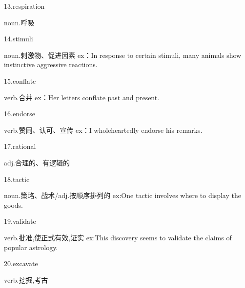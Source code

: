 \documentclass[a4paper, 10pt]{article}
\begin{document}
13.respiration 

noun.呼吸

14.stimuli 

noun.刺激物、促进因素 ex：In response to certain stimuli, many animals show instinctive aggressive reactions.

15.conflate 

verb.合并 ex：Her letters conflate past and present.

16.endorse

verb.赞同、认可、宣传 ex：I wholeheartedly endorse his remarks.


17.rational 

adj.合理的、有逻辑的

18.tactic 

noun.策略、战术/adj.按顺序排列的 ex:One tactic involves where to display the goods.

19.validate 

verb.批准,使正式有效,证实 ex:This discovery seems to validate the claims of popular astrology.

20.excavate

verb.挖掘,考古
\end{document}
